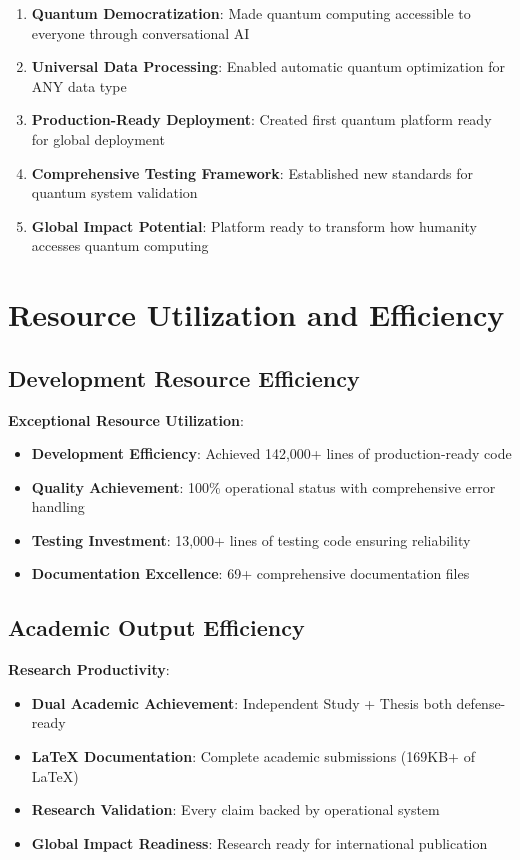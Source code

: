 \documentclass[12pt,a4paper]{article}
\begin{document}
\begin{enumerate}
    \item \textbf{Quantum Democratization}: Made quantum computing accessible to everyone through conversational AI
    
    \item \textbf{Universal Data Processing}: Enabled automatic quantum optimization for ANY data type
    
    \item \textbf{Production-Ready Deployment}: Created first quantum platform ready for global deployment
    
    \item \textbf{Comprehensive Testing Framework}: Established new standards for quantum system validation
    
    \item \textbf{Global Impact Potential}: Platform ready to transform how humanity accesses quantum computing
\end{enumerate}

\section{Resource Utilization and Efficiency}

\subsection{Development Resource Efficiency}

\textbf{Exceptional Resource Utilization}:
\begin{itemize}
    \item \textbf{Development Efficiency}: Achieved 142,000+ lines of production-ready code
    \item \textbf{Quality Achievement}: 100\% operational status with comprehensive error handling
    \item \textbf{Testing Investment}: 13,000+ lines of testing code ensuring reliability
    \item \textbf{Documentation Excellence}: 69+ comprehensive documentation files
\end{itemize}

\subsection{Academic Output Efficiency}

\textbf{Research Productivity}:
\begin{itemize}
    \item \textbf{Dual Academic Achievement}: Independent Study + Thesis both defense-ready
    \item \textbf{LaTeX Documentation}: Complete academic submissions (169KB+ of LaTeX)
    \item \textbf{Research Validation}: Every claim backed by operational system
    \item \textbf{Global Impact Readiness}: Research ready for international publication
\end{itemize}
\end{document}
